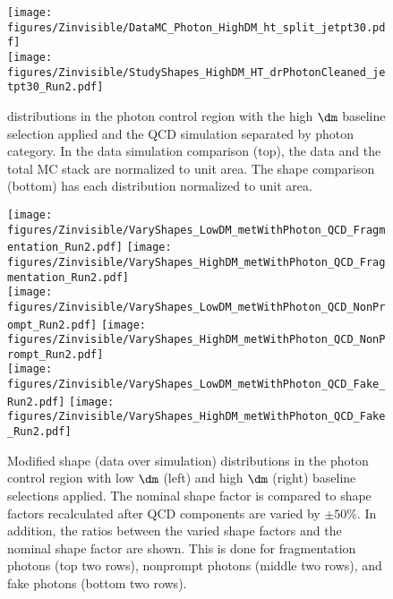 \begin{figure}[tbp]
{
\centering
\texttt{[image: figures/Zinvisible/DataMC\_Photon\_HighDM\_ht\_split\_jetpt30.pdf]}\\
\centering
\hspace*{1ex}
\texttt{[image: figures/Zinvisible/StudyShapes\_HighDM\_HT\_drPhotonCleaned\_jetpt30\_Run2.pdf]}\\
\caption[\HT distributions in the photon control region with the high $\dm$ baseline selection applied and the QCD simulation separated by photon category]
{
    \HT distributions in the photon control region with the high $\dm$ baseline selection applied and the QCD simulation separated by photon category.
    In the data simulation comparison (top), the data and the total MC stack are normalized to unit area.
    The shape comparison (bottom) has each distribution normalized to unit area.
}
\label{fig:photon_ht_study}
}
\end{figure}

\begin{figure}[tbp]
{
\centering
\texttt{[image: figures/Zinvisible/VaryShapes\_LowDM\_metWithPhoton\_QCD\_Fragmentation\_Run2.pdf]}
\texttt{[image: figures/Zinvisible/VaryShapes\_HighDM\_metWithPhoton\_QCD\_Fragmentation\_Run2.pdf]}\\
\texttt{[image: figures/Zinvisible/VaryShapes\_LowDM\_metWithPhoton\_QCD\_NonPrompt\_Run2.pdf]}
\texttt{[image: figures/Zinvisible/VaryShapes\_HighDM\_metWithPhoton\_QCD\_NonPrompt\_Run2.pdf]}\\
\texttt{[image: figures/Zinvisible/VaryShapes\_LowDM\_metWithPhoton\_QCD\_Fake\_Run2.pdf]}
\texttt{[image: figures/Zinvisible/VaryShapes\_HighDM\_metWithPhoton\_QCD\_Fake\_Run2.pdf]}
\caption[Modified \metphoton shape distributions in the photon control region with low $\dm$ and high $\dm$ baseline selections applied]
{
    Modified \metphoton shape (data over simulation) distributions in the photon control region with low $\dm$ (left) and high $\dm$ (right) baseline selections applied.
    The nominal shape factor is compared to shape factors recalculated after QCD components are varied by $\pm 50\%$.
    In addition, the ratios between the varied shape factors and the nominal shape factor are shown.
    This is done for fragmentation photons (top two rows), nonprompt photons (middle two rows), and fake photons (bottom two rows).
}
\label{fig:photon_met_vary}
}
\end{figure}

